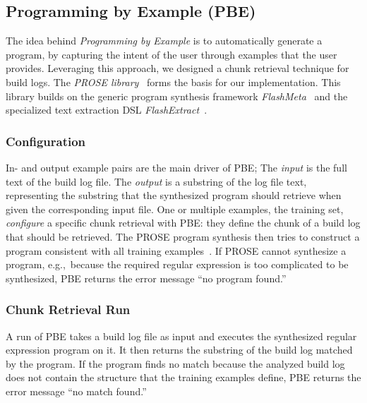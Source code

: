 \subsection{Programming by Example (PBE)}
The idea behind \emph{Programming by Example} is to automatically
generate a program, by capturing the
intent of the user through examples that the user provides.
Leveraging this approach, we designed a chunk retrieval technique
for build logs.
The \emph{PROSE library}~\cite{prose2019webpage} forms the basis for
our implementation.
This library builds on the generic program synthesis framework
\emph{FlashMeta}~\cite{polozov2015flashmeta:} and the specialized
text extraction DSL \emph{FlashExtract}~\cite{le2014flashextract:}.

\subsubsection{Configuration}
In- and output example pairs are the main driver of PBE;
The \emph{input} is the full text of the build log file.
The \emph{output} is
a substring of the log file text, representing the
substring that the synthesized program should retrieve when
given the corresponding input file.
One or multiple examples, the
training set, \emph{configure} a specific chunk retrieval with PBE:
they define the chunk of a build log that should be retrieved.
The PROSE program synthesis then tries to construct a program
consistent with all training
examples~\cite{mitchell1982generalization}.
If PROSE cannot synthesize a program, e.g.,\
because the required regular expression
is too complicated to be synthesized, PBE returns the
error message ``no program found.''

\subsubsection{Chunk Retrieval Run}
A run of PBE takes a build log file as input and executes the
synthesized regular expression program on it.
It then returns the substring
of the build log matched by the program.
If the program finds no match because the analyzed build log
does not contain the structure that the training examples define,
PBE returns the error message ``no match found.''

